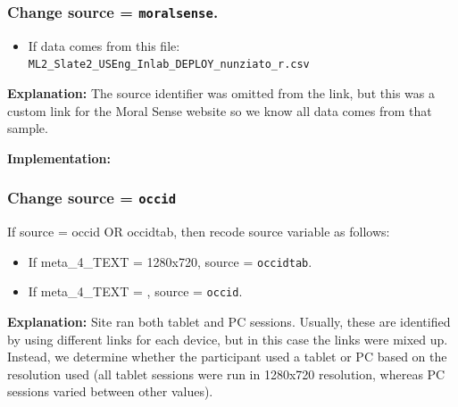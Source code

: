 \documentclass[]{article}
\newenvironment{Shaded}{\begin{snugshade}}{\end{snugshade}}
\newcommand{\DecValTok}[1]{\textcolor[rgb]{0.86,0.86,0.80}{{#1}}}
\newcommand{\StringTok}[1]{\textcolor[rgb]{0.80,0.58,0.58}{{#1}}}
\newcommand{\CommentTok}[1]{\textcolor[rgb]{0.50,0.62,0.50}{{#1}}}
\newcommand{\NormalTok}[1]{\textcolor[rgb]{0.80,0.80,0.80}{{#1}}}
\begin{document}
\subsubsection{\textbf{Change} source =
\texttt{moralsense}.}\label{change-source-moralsense.}

\begin{itemize}
\itemsep1pt\parskip0pt
\item
  If data comes from this file:
  \texttt{ML2\_Slate2\_USEng\_Inlab\_DEPLOY\_nunziato\_r.csv}
\end{itemize}

\textbf{Explanation:} The source identifier was omitted from the link,
but this was a custom link for the Moral Sense website so we know all
data comes from that sample.

\textbf{Implementation:}

\begin{Shaded}
\end{Shaded}

\subsubsection{\textbf{Change} source =
\texttt{occid}}\label{change-source-occid}

If source = occid OR occidtab, then recode source variable as follows:

\begin{itemize}
\itemsep1pt\parskip0pt
\item
  If meta\_4\_TEXT = 1280x720, source = \texttt{occidtab}.
\item
  If meta\_4\_TEXT = , source = \texttt{occid}.
\end{itemize}

\textbf{Explanation:} Site ran both tablet and PC sessions. Usually,
these are identified by using different links for each device, but in
this case the links were mixed up. Instead, we determine whether the
participant used a tablet or PC based on the resolution used (all tablet
sessions were run in 1280x720 resolution, whereas PC sessions varied
between other values).
\end{document}
